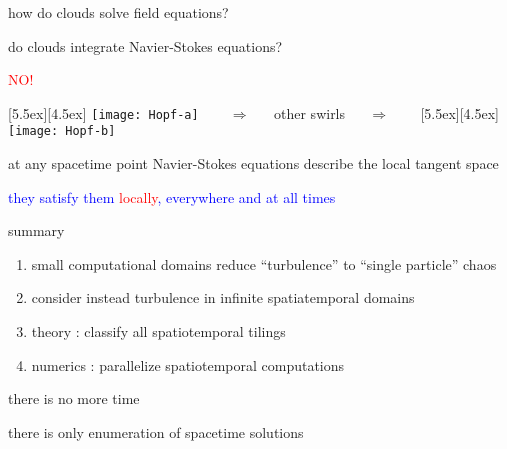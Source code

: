 \begin{frame}{how do clouds solve field equations?}

do clouds integrate Navier-Stokes equations?

\begin{center}
\centerline{\textcolor{red}{\Huge NO!}}

\begin{minipage}[t]{\textwidth}
	\begin{center}
\centerline{
\raisebox{-4.0ex}[5.5ex][4.5ex]
		 {\texttt{[image: Hopf-a]}}
~~~ $\Longrightarrow$ ~~ {other swirls} ~~ $\Longrightarrow$ ~~~
	\raisebox{-4.0ex}[5.5ex][4.5ex]
		 {\texttt{[image: Hopf-b]}}
          }
	\end{center}
\end{minipage}
\end{center}

at any spacetime point Navier-Stokes equations describe the local tangent space

\bigskip

\centerline{
\textcolor{blue}{they satisfy them \textcolor{red}{\large locally}, everywhere and at all times}
}
\end{frame}


\begin{frame}{summary}
\begin{enumerate}
              \item
small computational domains reduce ``turbulence'' to ``single particle'' chaos
              \item
consider instead turbulence in infinite spatiatemporal domains
              \item
theory : classify all spatiotemporal tilings
              \item
numerics : parallelize spatiotemporal computations
\end{enumerate}

\vfill

there is no more time

\medskip

there is only enumeration of spacetime solutions
\end{frame}


